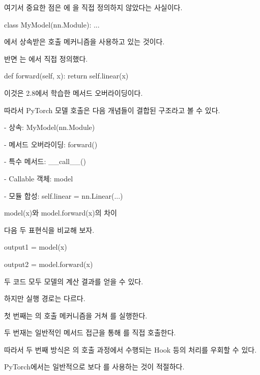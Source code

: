 여기서 중요한 점은 에 을 직접 정의하지 않았다는 사실이다.

\begin{dhkcode}
class MyModel(nn.Module):
    ...
\end{dhkcode}

에서 상속받은 호출 메커니즘을 사용하고 있는 것이다.

반면 는 에서 직접 정의했다.

\begin{dhkcode}
def forward(self, x):
    return self.linear(x)
\end{dhkcode}

이것은 2.8에서 학습한 메서드 오버라이딩이다.

따라서 PyTorch 모델 호출은 다음 개념들이 결합된 구조라고 볼 수 있다.

\begin{dhksmry}
    - 상속: MyModel(nn.Module)

    - 메서드 오버라이딩: forward()

    - 특수 메서드: __call__()

    - Callable 객체: model

    - 모듈 합성: self.linear = nn.Linear(...)
\end{dhksmry}

\begin{dhknote}
\begin{dhksmry}[centered]
model(x)와 model.forward(x)의 차이
\end{dhksmry}
\end{dhknote}

다음 두 표현식을 비교해 보자.

\begin{dhkcode}
output1 = model(x)

output2 = model.forward(x)
\end{dhkcode}

두 코드 모두 모델의 계산 결과를 얻을 수 있다.

하지만 실행 경로는 다르다.

첫 번째는 의 호출 메커니즘을 거쳐 를 실행한다.

두 번재는 일반적인 메서드 접근을 통해 를 직접 호출한다.

따라서 두 번째 방식은 의 호출 과정에서 수행되는 Hook 등의 처리를 우회할 수 있다.

PyTorch에서는 일반적으로 보다 를 사용하는 것이 적절하다.

